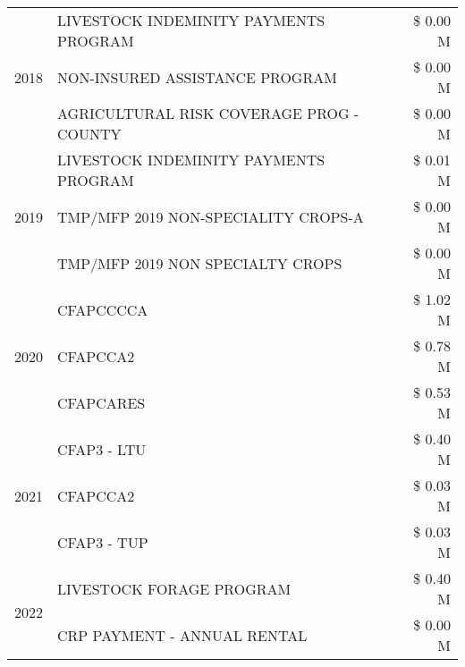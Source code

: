 \begin{tabular}{llr}
\cline{1-3}
\multirow[t]{3}{*}{2018} & LIVESTOCK INDEMINITY PAYMENTS PROGRAM & \$ 0.00 M \\
 & NON-INSURED ASSISTANCE PROGRAM & \$ 0.00 M \\
 & AGRICULTURAL RISK COVERAGE PROG - COUNTY & \$ 0.00 M \\
\cline{1-3}
\multirow[t]{3}{*}{2019} & LIVESTOCK INDEMINITY PAYMENTS PROGRAM & \$ 0.01 M \\
 & TMP/MFP 2019 NON-SPECIALITY CROPS-A & \$ 0.00 M \\
 & TMP/MFP 2019 NON SPECIALTY CROPS & \$ 0.00 M \\
\cline{1-3}
\multirow[t]{3}{*}{2020} & CFAPCCCCA & \$ 1.02 M \\
 & CFAPCCA2 & \$ 0.78 M \\
 & CFAPCARES & \$ 0.53 M \\
\cline{1-3}
\multirow[t]{3}{*}{2021} & CFAP3 - LTU & \$ 0.40 M \\
 & CFAPCCA2 & \$ 0.03 M \\
 & CFAP3 - TUP & \$ 0.03 M \\
\cline{1-3}
\multirow[t]{2}{*}{2022} & LIVESTOCK FORAGE PROGRAM & \$ 0.40 M \\
 & CRP PAYMENT - ANNUAL RENTAL & \$ 0.00 M \\
\cline{1-3}
\bottomrule
\end{tabular}
